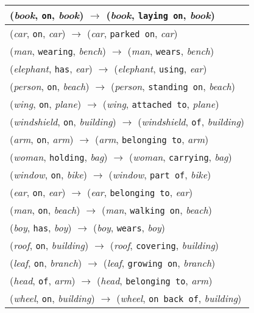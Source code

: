 \documentclass[runningheads]{llncs}
\begin{document}
{\begin{longtable}{ l }
(\textit{book}, \texttt{on}, \textit{book}) $\rightarrow$ (\textit{book}, \texttt{laying on}, \textit{book}) \\ \hline
(\textit{car}, \texttt{on}, \textit{car}) $\rightarrow$ (\textit{car}, \texttt{parked on}, \textit{car}) \\ \hline
(\textit{man}, \texttt{wearing}, \textit{bench}) $\rightarrow$ (\textit{man}, \texttt{wears}, \textit{bench}) \\ \hline
(\textit{elephant}, \texttt{has}, \textit{ear}) $\rightarrow$ (\textit{elephant}, \texttt{using}, \textit{ear}) \\ \hline
(\textit{person}, \texttt{on}, \textit{beach}) $\rightarrow$ (\textit{person}, \texttt{standing on}, \textit{beach}) \\ \hline
(\textit{wing}, \texttt{on}, \textit{plane}) $\rightarrow$ (\textit{wing}, \texttt{attached to}, \textit{plane}) \\ \hline
(\textit{windshield}, \texttt{on}, \textit{building}) $\rightarrow$ (\textit{windshield}, \texttt{of}, \textit{building}) \\ \hline
(\textit{arm}, \texttt{on}, \textit{arm}) $\rightarrow$ (\textit{arm}, \texttt{belonging to}, \textit{arm}) \\ \hline
(\textit{woman}, \texttt{holding}, \textit{bag}) $\rightarrow$ (\textit{woman}, \texttt{carrying}, \textit{bag}) \\ \hline
(\textit{window}, \texttt{on}, \textit{bike}) $\rightarrow$ (\textit{window}, \texttt{part of}, \textit{bike}) \\ \hline
(\textit{ear}, \texttt{on}, \textit{ear}) $\rightarrow$ (\textit{ear}, \texttt{belonging to}, \textit{ear}) \\ \hline
(\textit{man}, \texttt{on}, \textit{beach}) $\rightarrow$ (\textit{man}, \texttt{walking on}, \textit{beach}) \\ \hline
(\textit{boy}, \texttt{has}, \textit{boy}) $\rightarrow$ (\textit{boy}, \texttt{wears}, \textit{boy}) \\ \hline
(\textit{roof}, \texttt{on}, \textit{building}) $\rightarrow$ (\textit{roof}, \texttt{covering}, \textit{building}) \\ \hline
(\textit{leaf}, \texttt{on}, \textit{branch}) $\rightarrow$ (\textit{leaf}, \texttt{growing on}, \textit{branch}) \\ \hline
(\textit{head}, \texttt{of}, \textit{arm}) $\rightarrow$ (\textit{head}, \texttt{belonging to}, \textit{arm}) \\ \hline
(\textit{wheel}, \texttt{on}, \textit{building}) $\rightarrow$ (\textit{wheel}, \texttt{on back of}, \textit{building}) \\ \hline

\end{longtable}}
\end{document}
